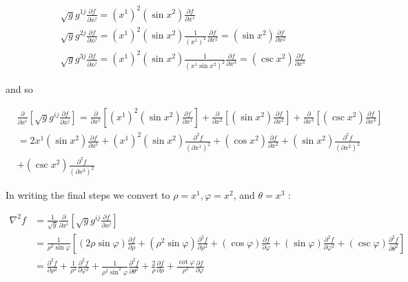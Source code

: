 \documentclass[10pt]{article}
\begin{document}
$$
\begin{aligned}
& \sqrt{g} g^{1 j} \frac{\partial f}{\partial x^{j}}=\left(x^{1}\right)^{2}\left(\sin x^{2}\right) \frac{\partial f}{\partial x^{1}} \\
& \sqrt{g} g^{2 j} \frac{\partial f}{\partial x^{j}}=\left(x^{1}\right)^{2}\left(\sin x^{2}\right) \frac{1}{\left(x^{1}\right)^{2}} \frac{\partial f}{\partial x^{2}}=\left(\sin x^{2}\right) \frac{\partial f}{\partial x^{2}} \\
& \sqrt{g} g^{3 j} \frac{\partial f}{\partial x^{j}}=\left(x^{1}\right)^{2}\left(\sin x^{2}\right) \frac{1}{\left(x^{1} \sin x^{2}\right)^{2}} \frac{\partial f}{\partial x^{3}}=\left(\csc x^{2}\right) \frac{\partial f}{\partial x^{3}}
\end{aligned}
$$

and so

$$
\begin{aligned}
& \frac{\partial}{\partial x^{i}}\left[\sqrt{g} g^{i j} \frac{\partial f}{\partial x^{j}}\right]=\frac{\partial}{\partial x^{1}} {\left[\left(x^{1}\right)^{2}\left(\sin x^{2}\right) \frac{\partial f}{\partial x^{1}}\right]+\frac{\partial}{\partial x^{2}}\left[\left(\sin x^{2}\right) \frac{\partial f}{\partial x^{2}}\right]+\frac{\partial}{\partial x^{3}}\left[\left(\csc x^{2}\right) \frac{\partial f}{\partial x^{3}}\right] } \\
&=2 x^{1}\left(\sin x^{2}\right) \frac{\partial f}{\partial x^{1}}+\left(x^{1}\right)^{2}\left(\sin x^{2}\right) \frac{\partial^{2} f}{\left(\partial x^{1}\right)^{2}}+\left(\cos x^{2}\right) \frac{\partial f}{\partial x^{2}}+\left(\sin x^{2}\right) \frac{\partial^{2} f}{\left(\partial x^{2}\right)^{2}} \\
&+\left(\csc x^{2}\right) \frac{\partial^{2} f}{\left(\partial x^{3}\right)^{2}}
\end{aligned}
$$

In writing the final steps we convert to $\rho=x^{1}, \varphi=x^{2}$, and $\theta=x^{3}$ :

$$
\begin{aligned}
\nabla^{2} f & =\frac{1}{\sqrt{g}} \frac{\partial}{\partial x^{i}}\left[\sqrt{g} g^{i j} \frac{\partial f}{\partial x^{j}}\right] \\
& =\frac{1}{\rho^{2} \sin \varphi}\left[(2 \rho \sin \varphi) \frac{\partial f}{\partial \rho}+\left(\rho^{2} \sin \varphi\right) \frac{\partial^{2} f}{\partial \rho^{2}}+(\cos \varphi) \frac{\partial f}{\partial \varphi}+(\sin \varphi) \frac{\partial^{2} f}{\partial \varphi^{2}}+(\csc \varphi) \frac{\partial^{2} f}{\partial \theta^{2}}\right] \\
& =\frac{\partial^{2} f}{\partial \rho^{2}}+\frac{1}{\rho^{2}} \frac{\partial^{2} f}{\partial \varphi^{2}}+\frac{1}{\rho^{2} \sin ^{2} \varphi} \frac{\partial^{2} f}{\partial \theta^{2}}+\frac{2}{\rho} \frac{\partial f}{\partial \rho}+\frac{\cot \varphi}{\rho^{2}} \frac{\partial f}{\partial \varphi}
\end{aligned}
$$
\end{document}
